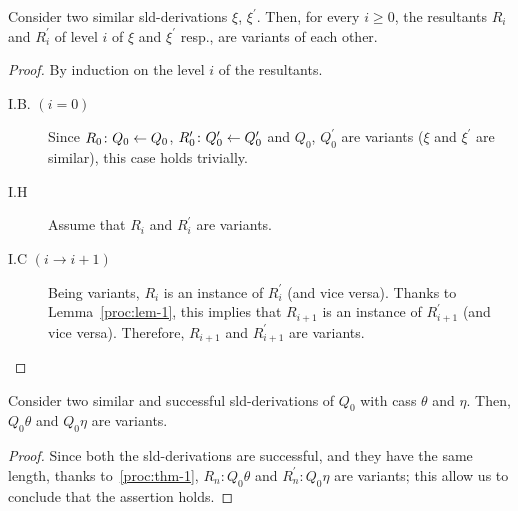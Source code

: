   \begin{thm}[On variants]
    \label{proc:thm-1}
      Consider two similar \gls{sld}-derivations \(\xi\), \(\xi^\prime\).
      Then, for every \(i \ge 0\), the resultants \(R_i\) and \(R_i^\prime\) of level \(i\) of \(\xi\) and \(\xi^\prime\) resp., are variants of each other.
  \end{thm}
  \begin{proof}
    By induction on the level \(i\) of the resultants.
    \begin{description}
        \item[I.B. \((i = 0)\)] Since \(R_0 \colon Q_0 \leftarrow Q_0\), \(R_0^\prime \colon Q_0^\prime \leftarrow Q_0^\prime\) and \(Q_0\), \(Q_0^\prime\) are variants (\(\xi\) and \(\xi^\prime\) are similar), this case holds trivially.
        \item[I.H] Assume that \(R_i\) and \(R_i^\prime\) are variants.
        \item[I.C \((i \to i+1)\)] Being variants, \(R_i\) is an instance of \(R_i^\prime\) (and vice versa).
        Thanks to Lemma~\ref{proc:lem-1}, this implies that \(R_{i+1}\) is an instance of \(R_{i+1}^\prime\) (and vice versa).
        Therefore, \(R_{i+1}\) and \(R_{i+1}^\prime\) are variants.
    \end{description}
  \end{proof}

  \begin{cor}
    \label{proc:cor-2}
      Consider two similar and successful \gls{sld}-derivations of \(Q_0\) with \gls{cas}s \(\theta\) and \(\eta\).
      Then, \(Q_0\theta\) and \(Q_0\eta\) are variants.
  \end{cor}
  \begin{proof}
      Since both the \gls{sld}-derivations are successful, and they have the same length, thanks to~\ref{proc:thm-1}, \(R_n \colon Q_0\theta\) and \(R_n^\prime \colon Q_0\eta\) are variants; this allow us to conclude that the assertion holds.
  \end{proof}


